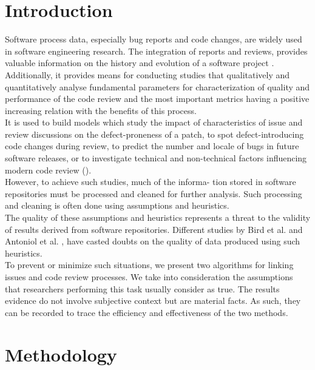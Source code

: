 \documentclass[conference,compsoc]{IEEEtran}
\begin{document}
\section{Introduction}
Software process data, especially bug reports and code
changes, are widely used in software engineering research.
The integration of reports and reviews, provides 
valuable information on the history and evolution of
a software project \cite{1bib}.
\\
Additionally, it provides means for conducting studies that qualitatively 
and quantitatively analyse fundamental parameters for characterization of 
quality and performance of the code review and the
most important metrics having a positive increasing relation
with the benefits of this process.
\\
It is used to build models which study the impact of
characteristics of issue and review discussions on the defect-proneness of 
a patch, to spot defect-introducing code
changes during review, to predict the number and locale of
bugs in future software releases, or to investigate technical
and non-technical factors influencing modern code review 
(\cite{2bib,3bib,4bib,5bib,6bib,7bib}).
\\
However, to achieve such studies, much of the informa-
tion stored in software repositories must be processed and
cleaned for further analysis. Such processing and cleaning
is often done using assumptions and heuristics.
\\
The quality of these assumptions and heuristics represents 
a threat to the validity of results derived from software
repositories. Different studies by Bird et al. \cite{8bib} and Antoniol
et al. \cite{9bib}, have casted doubts on the quality of data produced 
using such heuristics.
\\
To prevent or minimize such situations, we present two algorithms 
for linking issues and code review processes. We 
take into consideration the assumptions that researchers performing 
this task usually consider as true.
The results evidence do not
involve subjective context but are material facts. As such,
they can be recorded to trace the efficiency and effectiveness 
of the two methods.

 

\section{Methodology}
\end{document}
